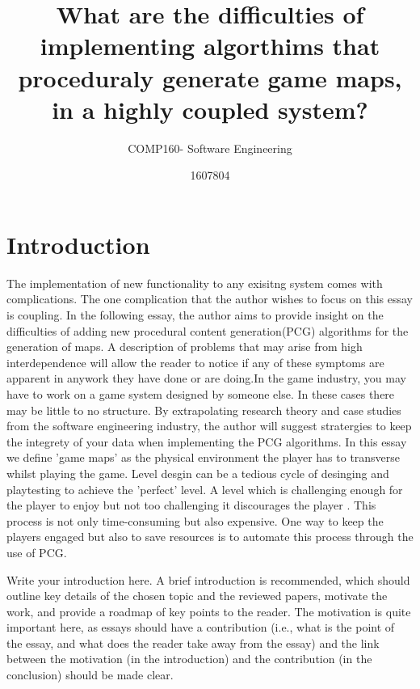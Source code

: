 \documentclass{scrartcl}
\title{What are the difficulties of implementing algorthims that proceduraly generate game maps, in a highly coupled system?}
\subtitle{COMP160- Software Engineering}
\author{1607804}
\begin{document}
\maketitle


\section{Introduction}
The implementation of new functionality to any exisitng system comes with complications. The one complication that the author wishes to focus on this essay is coupling. In the following essay, the author aims to provide insight on the difficulties of adding new procedural content generation(PCG) algorithms for the generation of maps. A description of problems that may arise from high interdependence will allow the reader to notice if any of these symptoms are apparent in anywork they have done or are doing.In the game industry, you may have to work on a game system designed by someone else. In these cases there may be little to no structure. By extrapolating research theory and case studies from the software engineering industry, the author will suggest stratergies to keep the integrety of your data when implementing the PCG algorithms. In this essay we define 'game maps' as the physical environment the player has to transverse whilst playing the game. Level desgin can be a tedious cycle of desinging and playtesting to achieve the 'perfect' level. A level which is challenging enough for the player to enjoy but not too challenging it discourages the player \cite {kayali2011retro}. This process is not only time-consuming but also expensive. One way to keep the players engaged but also to save resources is to automate this process through the use of PCG.  


Write your introduction here. A brief introduction is recommended, which should outline key details of the chosen topic and the reviewed papers, motivate the work, and provide a roadmap of key points to the reader. The motivation is quite important here, as essays should have a contribution (i.e., what is the point of the essay, and what does the reader take away from the essay) and the link between the motivation (in the introduction) and the contribution (in the conclusion) should be made clear.
\end{document}
